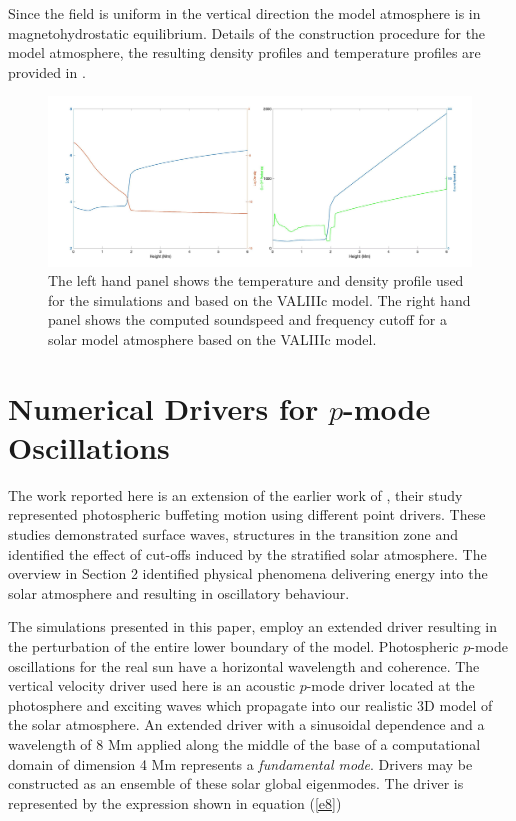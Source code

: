 \documentclass[linenumbers]{aastex63}
\begin{document}
Since the field is uniform in the vertical direction the model atmosphere is in magnetohydrostatic equilibrium. Details of the construction procedure for the model atmosphere, the resulting density profiles and temperature profiles are provided in \citet{Griffiths2018b}. 
 
\begin{figure}[h]\label{soundspeedVAL3C_profile_fig1R}
\includegraphics[scale=0.15]{solatmosprofiles.jpg}
\caption{The left hand panel shows the temperature and density profile used for the simulations and based on the VALIIIc model. The right hand panel shows the computed soundspeed and frequency cutoff for a solar model atmosphere based on the VALIIIc model.}
\end{figure}

\section{Numerical Drivers for $p$-mode Oscillations}

The work reported here is an extension of the earlier work of \citet{Malins2007}, their study represented photospheric buffeting motion using different point drivers. These studies demonstrated surface waves, structures in the transition zone and identified the effect of cut-offs induced by the stratified  solar atmosphere. The overview in Section 2 identified physical phenomena delivering energy into the solar atmosphere and resulting in oscillatory behaviour. 

The simulations presented in this paper, employ an extended driver resulting in the perturbation of the entire lower boundary of the model.  Photospheric $p$-mode oscillations for the real sun have a horizontal wavelength and coherence. The vertical velocity driver used here is an acoustic $p$-mode driver located at the photosphere and exciting waves which propagate 
into our realistic 3D model of the solar atmosphere. An extended driver with a sinusoidal dependence and a wavelength of 8 Mm applied along the middle of the base of a computational domain of dimension 4 Mm represents  a {\it fundamental mode}. Drivers may be constructed as an ensemble of these solar global eigenmodes. The driver is represented by the expression shown in equation (\ref{e8}) 
\end{document}
